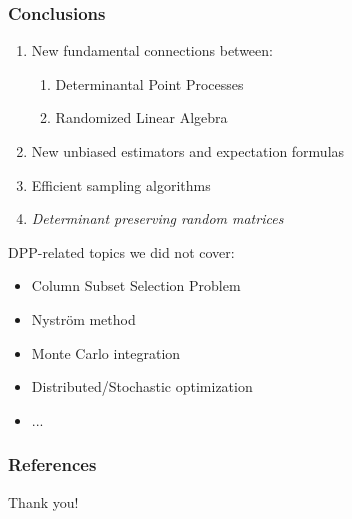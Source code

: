 \documentclass[handout]{beamer}
\begin{document}
\begin{frame}
  \frametitle{Conclusions}

  \begin{enumerate}
  \item New fundamental connections between:
    \begin{enumerate}
      \item Determinantal Point Processes
      \item Randomized Linear Algebra
      \end{enumerate}\pause\vspace{2mm}
    \item New unbiased estimators and expectation
      formulas\vspace{2mm}\pause
      \item Efficient sampling algorithms\vspace{2mm}\pause
    \item \textit{Determinant preserving random matrices}
    \end{enumerate}
    \pause
    \vspace{5mm}
    {\footnotesize
DPP-related topics we did not cover:\vspace{-2mm}
    \begin{itemize}
    \item Column Subset Selection Problem\vspace{-3mm}
    \item Nystr\"om method\vspace{-3mm}
    \item Monte Carlo integration\vspace{-3mm}
    \item Distributed/Stochastic optimization\vspace{-3mm}
    \item ...
    \end{itemize}}
\end{frame}

\begin{frame}[allowframebreaks]
  \frametitle{References}
  \tiny
  
  
\end{frame}

\begin{frame}
\centering  \Large Thank you!
\end{frame}
\end{document}
